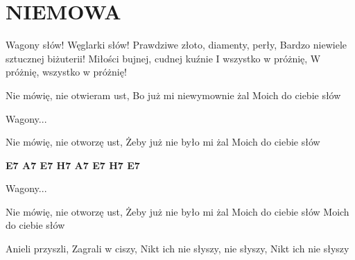 \documentclass[../../../songbook.tex]{subfiles}
\begin{document}
\TabPositions{8cm} %
\section*{NIEMOWA}
{}
\vspace{0.5cm}
\-\hspace{1cm} Wagony słów! Węglarki słów!			 \newline
\-\hspace{1cm} Prawdziwe złoto, diamenty, perły, \newline
\-\hspace{1cm} Bardzo niewiele sztucznej biżuterii!	 \newline
\-\hspace{1cm} Miłości bujnej, cudnej kuźnie		 \newline
\-\hspace{1cm} I wszystko w próżnię,				 \newline
\-\hspace{1cm} W próżnię, wszystko w próżnię!		 \newline

Nie mówię, nie otwieram ust,	 \newline
Bo już mi niewymownie żal		 \newline
Moich do ciebie słów			 \newline

\-\hspace{1cm} Wagony... \newline

Nie mówię, nie otworzę ust,		 \newline
Żeby już nie było mi żal		 \newline
Moich do ciebie słów			 \newline

{\color{red}\textbf{E7 A7 E7 H7 A7  E7 H7 E7} } \newline

\-\hspace{1cm} Wagony... \newline

Nie mówię, nie otworzę ust,	 \newline
Żeby już nie było mi żal	 \newline	
Moich do ciebie słów	 \newline	
Moich do ciebie słów	 \newline	

Anieli przyszli, \newline
Zagrali w ciszy, \newline
Nikt ich nie słyszy, nie słyszy, \newline
Nikt ich nie słyszy \newline
\end{document}
